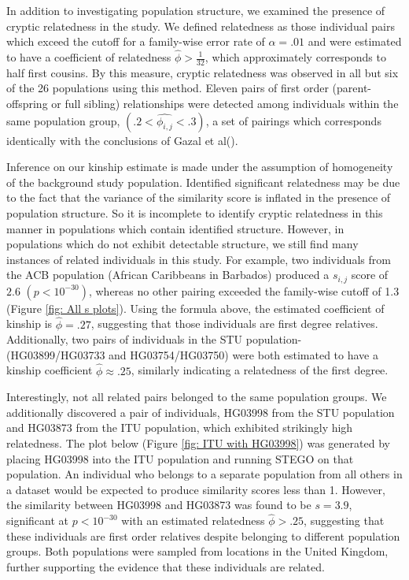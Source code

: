 In addition to investigating population structure, we examined the
presence of cryptic relatedness in the study. We defined relatedness
as those individual pairs which exceed the cutoff for a family-wise
error rate of $\alpha=.01$ and were estimated to have a coefficient
of relatedness $\hat{\phi}>\frac{1}{32}$, which approximately corresponds
to half first cousins. By this measure, cryptic relatedness was observed
in all but six of the 26 populations using this method. Eleven pairs
of first order (parent-offspring or full sibling) relationships were
detected among individuals within the same population group, $\left(.2<\hat{\phi_{i,j}}<.3\right)$,
a set of pairings which corresponds identically with the conclusions
of Gazal et al(\citealp{gazal2015high}).

Inference on our kinship estimate is made under the assumption of
homogeneity of the background study population. Identified significant
relatedness may be due to the fact that the variance of the similarity
score is inflated in the presence of population structure. So it is
incomplete to identify cryptic relatedness in this manner in populations
which contain identified structure. However, in populations which
do not exhibit detectable structure, we still find many instances
of related individuals in this study. For example, two individuals
from the ACB population (African Caribbeans in Barbados) produced
a $s_{i,j}$ score of $2.6$ $\left(p<10^{-30}\right)$, whereas no
other pairing exceeded the family-wise cutoff of 1.3 (Figure \ref{fig: All s plots}).
Using the formula above, the estimated coefficient of kinship is $\hat{\phi}=.27$,
suggesting that those individuals are first degree relatives. Additionally,
two pairs of individuals in the STU population- (HG03899/HG03733 and
HG03754/HG03750) were both estimated to have a kinship coefficient
$\hat{\phi}\approx.25$, similarly indicating a relatedness of the
first degree.

Interestingly, not all related pairs belonged to the same population
groups. We additionally discovered a pair of individuals, HG03998
from the STU population and HG03873 from the ITU population, which
exhibited strikingly high relatedness. The plot below (Figure \ref{fig: ITU with HG03998})
was generated by placing HG03998 into the ITU population and running
STEGO on that population. An individual who belongs to a separate
population from all others in a dataset would be expected to produce
similarity scores less than 1. However, the similarity between HG03998
and HG03873 was found to be $s=3.9$, significant at $p<10^{-30}$
with an estimated relatedness $\hat{\phi}>.25$, suggesting that these
individuals are first order relatives despite belonging to different
population groups. Both populations were sampled from locations in
the United Kingdom, further supporting the evidence that these individuals
are related.

